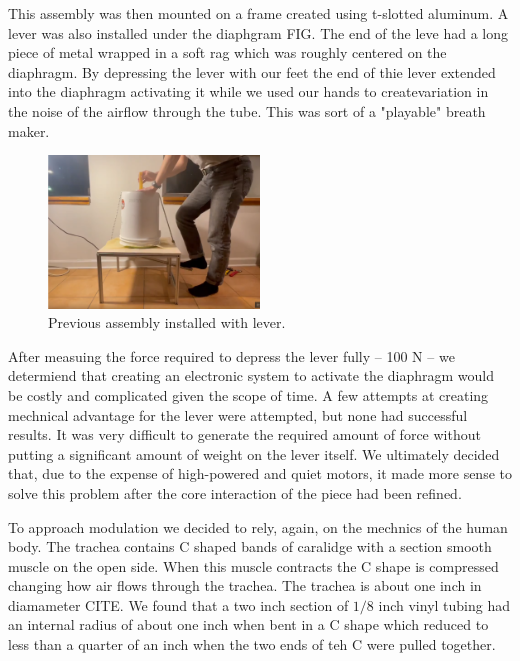 \documentclass[letterpaper]{article}
\begin{document}

This assembly was then mounted on a frame created using t-slotted aluminum. A lever was also installed under the diaphgram FIG. The end of the leve had a long piece of metal wrapped in a soft rag which was roughly centered on the diaphragm. By depressing the lever with our feet the end of thie lever extended into the diaphragm activating it while we used our hands to createvariation in the noise of the airflow through the tube. This was sort of a "playable" breath maker. 

\begin{figure}[h]
\includegraphics[width=0.5\textwidth]{images/playablebreath1.png}
\caption{Previous assembly installed with lever.}
\end{figure}

After measuing the force required to depress the lever fully -- 100 N -- we determiend that creating an electronic system to activate the diaphragm would be costly and complicated given the scope of time. A few attempts at creating mechnical advantage for the lever were attempted, but none had successful results. It was very difficult to generate the required amount of force without putting a significant amount of weight on the lever itself. We ultimately decided that, due to the expense of high-powered and quiet motors, it made more sense to solve this problem after the core interaction of the piece had been refined. 

To approach modulation we decided to rely, again, on the mechnics of the human body. The trachea contains C shaped bands of caralidge with a section smooth muscle on the open side. When this muscle contracts the C shape is compressed changing how air flows through the trachea. The trachea is about one inch in diamameter CITE. We found that a two inch section of $1/8$ inch vinyl tubing had an internal radius of about one inch when bent in a C shape which reduced to less than a quarter of an inch when the two ends of teh C were pulled together.  
\end{document}
